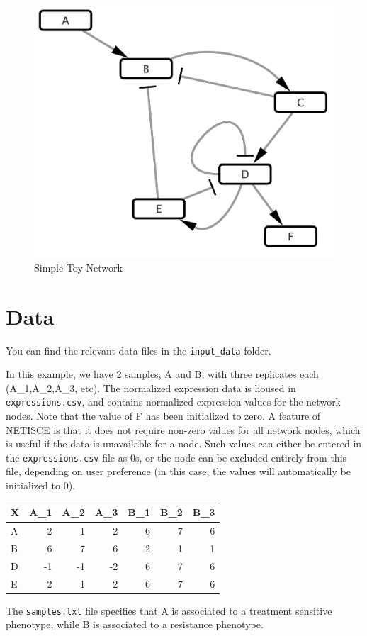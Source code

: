 \documentclass[
]{book}
\begin{document}
\begin{figure}

{\centering \includegraphics[width=0.5\linewidth]{images/toy_network} 

}

\caption{Simple Toy Network}\label{fig:unnamed-chunk-3}
\end{figure}

\hypertarget{data}{%
\section{Data}\label{data}}

You can find the relevant data files in the \texttt{input\_data} folder.

In this example, we have 2 samples, A and B, with three replicates each (A\_1,A\_2,A\_3, etc).
The normalized expression data is housed in \texttt{expressions.csv}, and contains normalized expression values for the network nodes. Note that the value of F has been initialized to zero. A feature of NETISCE is that it does not require non-zero values for all network nodes, which is useful if the data is unavailable for a node. Such values can either be entered in the \texttt{expressions.csv} file as 0s, or the node can be excluded entirely from this file, depending on user preference (in this case, the values will automatically be initialized to 0).

\begin{tabular}{l|r|r|r|r|r|r}
\hline
X & A\_1 & A\_2 & A\_3 & B\_1 & B\_2 & B\_3\\
\hline
A & 2 & 1 & 2 & 6 & 7 & 6\\
\hline
B & 6 & 7 & 6 & 2 & 1 & 1\\
\hline
D & -1 & -1 & -2 & 6 & 7 & 6\\
\hline
E & 2 & 1 & 2 & 6 & 7 & 6\\
\hline
\end{tabular}

The \texttt{samples.txt} file specifies that A is associated to a treatment sensitive phenotype, while B is associated to a resistance phenotype.
\end{document}
